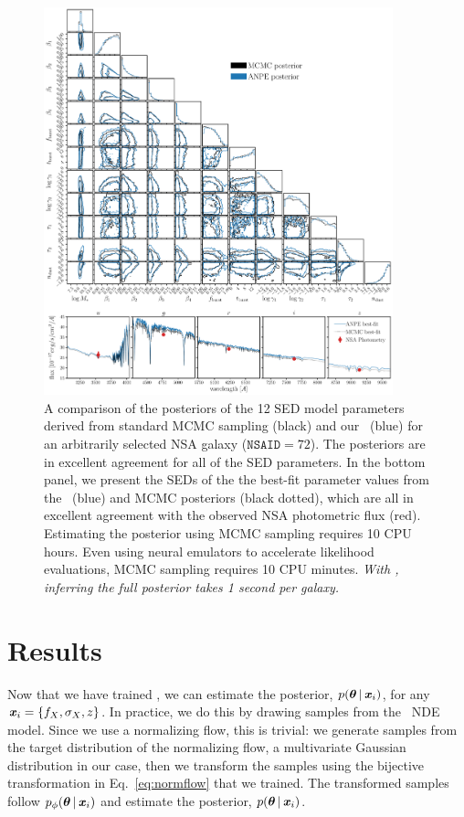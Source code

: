 \begin{figure}
\begin{center}
    \includegraphics[width=0.9\textwidth]{figs/corner.pdf}
    \caption{\label{fig:corner}
    A comparison of the posteriors of the 12 SED model parameters derived from
    standard MCMC sampling (black) and our \sedflow~(blue) for an arbitrarily
    selected NSA galaxy ($\mathtt{NSAID} = 72$).
    The posteriors are in excellent agreement for all of the SED parameters. 
    In the bottom panel, we present the SEDs of the the best-fit parameter
    values from the \sedflow~(blue) and MCMC posteriors (black dotted), which
    are all in excellent agreement with the observed NSA photometric flux
    (red). 
    Estimating the posterior using MCMC sampling requires 10 CPU hours. 
    Even using neural emulators to accelerate likelihood evaluations, MCMC
    sampling requires 10 CPU minutes. 
    \emph{With \sedflow, inferring the full posterior takes 1 second per
    galaxy.}
    }
\end{center}
\end{figure}

\section{Results} \label{sec:results}
Now that we have trained \sedflow, we can estimate the posterior,
$p(\boldsymbol{\theta}\,|\, \textbf{\textit{x}}_i)$, for any $\textbf{\textit{x}}_i = \{f_X, \sigma_X, z \}$. 
In practice, we do this by drawing samples from the \sedflow~NDE model. 
Since we use a normalizing flow, this is trivial:
we generate samples from the target distribution of the normalizing flow,  a
multivariate Gaussian distribution in our case, then we transform the samples
using the bijective transformation in Eq.~\ref{eq:normflow} that we trained.
The transformed samples follow $p_\phi(\boldsymbol{\theta}\,|\, \textbf{\textit{x}}_i)$ and 
estimate the posterior, $p(\boldsymbol{\theta}\,|\, \textbf{\textit{x}}_i)$. 

